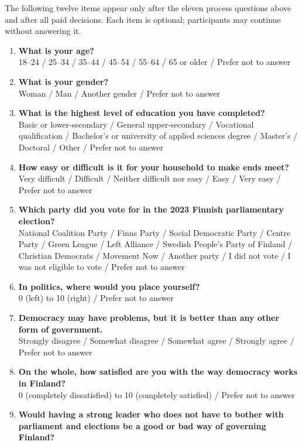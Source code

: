 The following twelve items appear only after the eleven process questions above and after all paid decisions. Each item is optional; participants may continue without answering it.
\begin{enumerate}
  \item \textbf{What is your age?}\\
  18--24 / 25--34 / 35--44 / 45--54 / 55--64 / 65 or older / Prefer not to answer
  \item \textbf{What is your gender?}\\
  Woman / Man / Another gender / Prefer not to answer
  \item \textbf{What is the highest level of education you have completed?}\\
  Basic or lower-secondary / General upper-secondary / Vocational qualification / Bachelor's or university of applied sciences degree / Master's / Doctoral / Other / Prefer not to answer
  \item \textbf{How easy or difficult is it for your household to make ends meet?}\\
  Very difficult / Difficult / Neither difficult nor easy / Easy / Very easy / Prefer not to answer
  \item \textbf{Which party did you vote for in the 2023 Finnish parliamentary election?}\\
  National Coalition Party / Finns Party / Social Democratic Party / Centre Party / Green League / Left Alliance / Swedish People's Party of Finland / Christian Democrats / Movement Now / Another party / I did not vote / I was not eligible to vote / Prefer not to answer
  \item \textbf{In politics, where would you place yourself?}\\
  0 (left) to 10 (right) / Prefer not to answer
  \item \textbf{Democracy may have problems, but it is better than any other form of government.}\\
  Strongly disagree / Somewhat disagree / Somewhat agree / Strongly agree / Prefer not to answer
  \item \textbf{On the whole, how satisfied are you with the way democracy works in Finland?}\\
  0 (completely dissatisfied) to 10 (completely satisfied) / Prefer not to answer
  \item \textbf{Would having a strong leader who does not have to bother with parliament and elections be a good or bad way of governing Finland?}\\

\end{enumerate}
